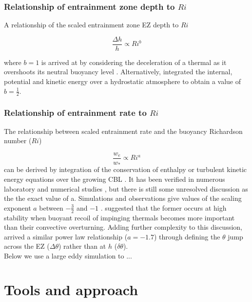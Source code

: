 \documentclass[referee]{svjour3}
\begin{document}
\subsubsection{Relationship of entrainment zone depth to $Ri$}

A relationship of the scaled entrainment zone EZ depth to $Ri$

\begin{equation}\label{eq:dhvsri}
\frac{\Delta h}{h} \propto Ri ^{b}
\end{equation}

where $b=1$ is arrived at by considering the deceleration of a thermal
as it overshoots its neutral buoyancy level \cite{StullNelEl}.  Alternatively, \cite{Boers89} integrated the internal, potential and kinetic energy over a hydrostatic atmosphere to obtain a value of $b=\frac{1}{2}$.

\subsubsection{Relationship of entrainment rate to $Ri$}
\label{subsec:erri}
The relationship between scaled entrainment rate and the buoyancy Richardson number ($Ri$)

\begin{equation}\label{eq:ervsri}
\frac{w_{e}}{w_{*}} \propto Ri^{a}
\end{equation}
can be derived by integration of the conservation of enthalpy or turbulent kinetic energy equations over the growing CBL \citep{Tennekes73, Deardorff79, Fedorovich04}. It has been verified in numerous laboratory and numerical studies \citep{DearWill80, Sullivan98, Fedorovich04, Brooks12}, but there is still some unresolved discussion as the the exact value of a.  Simulations and observations give  values of the scaling exponent $a$ between $-\frac{3}{2}$ and $-1$ \citep{Traum11}.  \cite{Turner86} suggested that the former occurs at high stability when buoyant recoil of impinging thermals becomes more important than their convective overturning.  Adding further complexity to this discussion, \cite{Fedorovich04} arrived a similar power law relationship ($a = -1.7$) through defining the $\theta$ jump across the EZ ($\Delta \theta$) rather than at $h$ ($\delta \theta$).\\

Below we use a large eddy simulation to ...

\section{Tools and approach}
\end{document}
